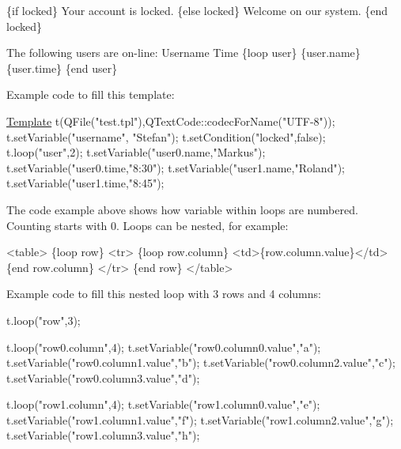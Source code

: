{\ttfamily 
\begin{DoxyPre}\{if locked\}
    Your account is locked.
\{else locked\}
    Welcome on our system.
\{end locked\}\end{DoxyPre}
}

{\ttfamily 
\begin{DoxyPre}The following users are on-line:
    Username       Time
\{loop user\}
    \{user.name\}    \{user.time\}
\{end user\}
\end{DoxyPre}
}

Example code to fill this template\+: 

{\ttfamily 
\begin{DoxyPre}
\mbox{\hyperlink{classstefanfrings_1_1_template}{Template}} t(QFile("test.tpl"),QTextCode::codecForName("UTF-8"));
t.setVariable("username", "Stefan");
t.setCondition("locked",false);
t.loop("user",2);
t.setVariable("user0.name,"Markus");
t.setVariable("user0.time,"8:30");
t.setVariable("user1.name,"Roland");
t.setVariable("user1.time,"8:45");
\end{DoxyPre}
}

The code example above shows how variable within loops are numbered. Counting starts with 0. Loops can be nested, for example\+: 

{\ttfamily 
\begin{DoxyPre}
<table>
\{loop row\}
    <tr>
    \{loop row.column\}
        <td>\{row.column.value\}</td>
    \{end row.column\}
    </tr>
\{end row\}
</table>
\end{DoxyPre}
}

Example code to fill this nested loop with 3 rows and 4 columns\+: 

{\ttfamily 
\begin{DoxyPre}
t.loop("row",3);\end{DoxyPre}
}

{\ttfamily 
\begin{DoxyPre}t.loop("row0.column",4);
t.setVariable("row0.column0.value","a");
t.setVariable("row0.column1.value","b");
t.setVariable("row0.column2.value","c");
t.setVariable("row0.column3.value","d");\end{DoxyPre}
}

{\ttfamily 
\begin{DoxyPre}t.loop("row1.column",4);
t.setVariable("row1.column0.value","e");
t.setVariable("row1.column1.value","f");
t.setVariable("row1.column2.value","g");
t.setVariable("row1.column3.value","h");\end{DoxyPre}
}

